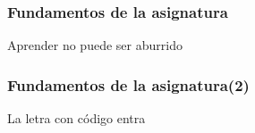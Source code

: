 
\begin{frame}
\frametitle{Fundamentos de la asignatura}

\vspace{5.4cm}

\begin{center}
  \Huge Aprender no puede ser aburrido
\end{center}

\end{frame}
\usebackgroundtemplate{}


\begin{frame}
\frametitle{Fundamentos de la asignatura(2)}

\vspace{5.4cm}

\begin{center}
  \Huge La letra con código entra
\end{center}

\end{frame}
\usebackgroundtemplate{}

